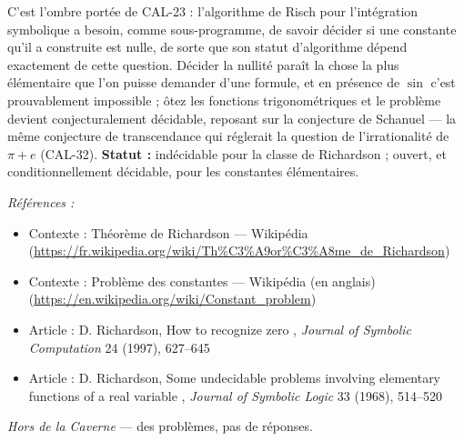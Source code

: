 \documentclass[11pt]{article}
\newenvironment{refs}{\par\small\noindent\emph{Références :}\begin{itemize}\setlength\itemsep{0pt}}{\end{itemize}\normalsize}
\begin{document}
\noindent C'est l'ombre portée de CAL-23 : l'algorithme de Risch pour l'intégration symbolique
a besoin, comme sous-programme, de savoir décider si une constante qu'il a construite est nulle, de sorte que
son statut d'algorithme dépend exactement de cette question. Décider la nullité paraît la chose la plus
élémentaire que l'on puisse demander d'une formule, et en présence de $ \sin $ c'est prouvablement
impossible ; ôtez les fonctions trigonométriques et le problème devient conjecturalement
décidable, reposant sur la conjecture de Schanuel --- la même conjecture de transcendance qui
réglerait la question de l'irrationalité de $ \pi + e $ (CAL-32). \textbf{Statut :} indécidable pour
la classe de Richardson ; ouvert, et conditionnellement décidable, pour les constantes élémentaires.

\begin{refs}
\item Contexte : Théorème de Richardson --- Wikipédia (\url{https://fr.wikipedia.org/wiki/Th%C3%A9or%C3%A8me_de_Richardson})
\item Contexte : Problème des constantes --- Wikipédia (en anglais) (\url{https://en.wikipedia.org/wiki/Constant_problem})
\item Article : D. Richardson, \og{} How to recognize zero \fg{}, \textit{Journal of Symbolic Computation} 24 (1997), 627--645
\item Article : D. Richardson, \og{} Some undecidable problems involving elementary functions of a real variable \fg{}, \textit{Journal of Symbolic Logic} 33 (1968), 514--520
\end{refs}

\bigskip


\vfill
\noindent\emph{Hors de la Caverne} --- des probl\`emes, pas de r\'eponses.
\end{document}
